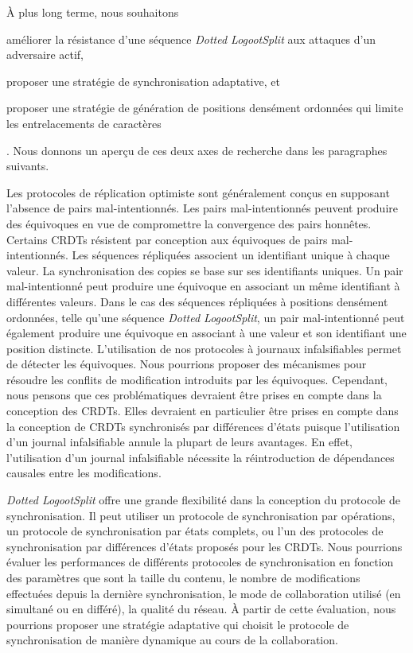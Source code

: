 À plus long terme, nous souhaitons \begin{inlinelist}\item améliorer la résistance d'une séquence \emph{Dotted LogootSplit} aux attaques d'un adversaire actif, \item proposer une stratégie de synchronisation adaptative, et \item proposer une stratégie de génération de positions densément ordonnées qui limite les entrelacements de caractères\end{inlinelist}.
Nous donnons un aperçu de ces deux axes de recherche dans les paragraphes suivants.

Les protocoles de réplication optimiste sont généralement conçus en supposant l'absence de pairs mal-intentionnés.
Les pairs mal-intentionnés peuvent produire des équivoques en vue de compromettre la convergence des pairs honnêtes.
Certains \acp{CRDT} résistent par conception aux équivoques de pairs mal-intentionnés.
Les séquences répliquées associent un identifiant unique à chaque valeur.
La synchronisation des copies se base sur ses identifiants uniques.
Un pair mal-intentionné peut produire une équivoque en associant un même identifiant à différentes valeurs.
Dans le cas des séquences répliquées à positions densément ordonnées, telle qu'une séquence \emph{Dotted LogootSplit}, un pair mal-intentionné peut également produire une équivoque en associant à une valeur et son identifiant une position distincte.
L'utilisation de nos protocoles à journaux infalsifiables permet de détecter les équivoques.
Nous pourrions proposer des mécanismes pour résoudre les conflits de modification introduits par les équivoques.
Cependant, nous pensons que ces problématiques devraient être prises en compte dans la conception des \acp{CRDT}.
Elles devraient en particulier être prises en compte dans la conception de \acp{CRDT} synchronisés par différences d'états puisque l'utilisation d'un journal infalsifiable annule la plupart de leurs avantages.
En effet, l'utilisation d'un journal infalsifiable nécessite la réintroduction de dépendances causales entre les modifications.

\emph{Dotted LogootSplit} offre une grande flexibilité dans la conception du protocole de synchronisation.
Il peut utiliser un protocole de synchronisation par opérations, un protocole de synchronisation par états complets, ou l'un des protocoles de synchronisation par différences d'états proposés pour les \acp{CRDT}.
Nous pourrions évaluer les performances de différents protocoles de synchronisation en fonction des paramètres que sont la taille du contenu, le nombre de modifications effectuées depuis la dernière synchronisation, le mode de collaboration utilisé (en simultané ou en différé), la qualité du réseau.
À partir de cette évaluation, nous pourrions proposer une stratégie adaptative qui choisit le protocole de synchronisation de manière dynamique au cours de la collaboration.


